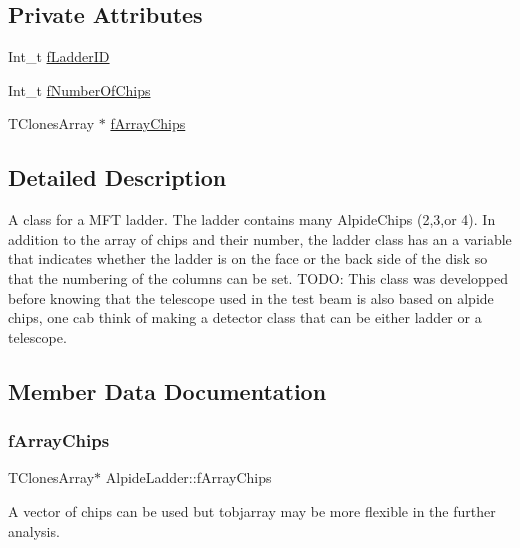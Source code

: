\subsection*{Private Attributes}
\begin{DoxyCompactItemize}
\item 
Int\+\_\+t \mbox{\hyperlink{class_alpide_ladder_a5e51ffcfae1349f109896750a8d983d4}{f\+Ladder\+ID}}
\item 
Int\+\_\+t \mbox{\hyperlink{class_alpide_ladder_a90b3940b3c8b563115cc16efa27f4478}{f\+Number\+Of\+Chips}}
\item 
T\+Clones\+Array $\ast$ \mbox{\hyperlink{class_alpide_ladder_a9539572046b2da5582019ae4f0148428}{f\+Array\+Chips}}
\end{DoxyCompactItemize}


\subsection{Detailed Description}
A class for a M\+FT ladder. The ladder contains many Alpide\+Chips (2,3,or 4). In addition to the array of chips and their number, the ladder class has an a variable that indicates whether the ladder is on the face or the back side of the disk so that the numbering of the columns can be set. T\+O\+DO\+: This class was developped before knowing that the telescope used in the test beam is also based on alpide chips, one cab think of making a detector class that can be either ladder or a telescope. 

\subsection{Member Data Documentation}
\mbox{\label{class_alpide_ladder_a9539572046b2da5582019ae4f0148428}} 
\subsubsection{\texorpdfstring{f\+Array\+Chips}{fArrayChips}}
{\footnotesize\ttfamily T\+Clones\+Array$\ast$ Alpide\+Ladder\+::f\+Array\+Chips\hspace{0.3cm}{\ttfamily [private]}}

A vector of chips can be used but tobjarray may be more flexible in the further analysis. \mbox{\label{class_alpide_ladder_a5e51ffcfae1349f109896750a8d983d4}} 
